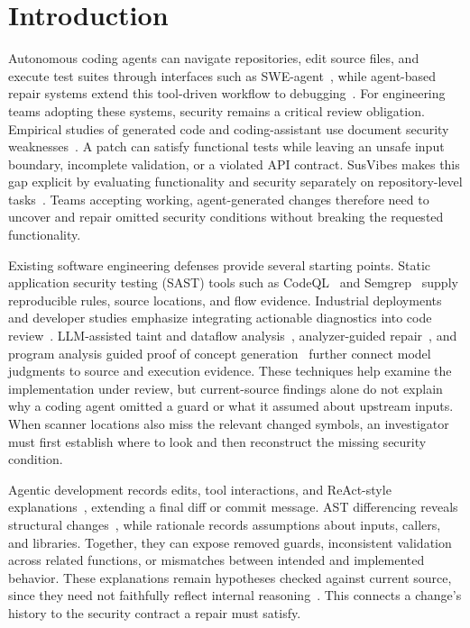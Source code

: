 \documentclass[10pt,conference]{IEEEtran}
\begin{document}
\section{Introduction}
Autonomous coding agents can navigate repositories, edit source files, and execute test suites through interfaces such as SWE-agent~\cite{sweagent}, while agent-based repair systems extend this tool-driven workflow to debugging~\cite{repairagent}. For engineering teams adopting these systems, security remains a critical review obligation. Empirical studies of generated code and coding-assistant use document security weaknesses~\cite{asleep,perry,copilotweaknesses}. A patch can satisfy functional tests while leaving an unsafe input boundary, incomplete validation, or a violated API contract. SusVibes makes this gap explicit by evaluating functionality and security separately on repository-level tasks~\cite{susvibes,susvibesartifact}. Teams accepting working, agent-generated changes therefore need to uncover and repair omitted security conditions without breaking the requested functionality.

Existing software engineering defenses provide several starting points. Static application security testing (SAST) tools such as CodeQL~\cite{codeql} and Semgrep~\cite{semgrep} supply reproducible rules, source locations, and flow evidence. Industrial deployments and developer studies emphasize integrating actionable diagnostics into code review~\cite{johnson,googleanalysis,infer}. LLM-assisted taint and dataflow analysis~\cite{iris,llmdfa,repoaudit}, analyzer-guided repair~\cite{inferfix}, and program analysis guided proof of concept generation~\cite{pagent} further connect model judgments to source and execution evidence. These techniques help examine the implementation under review, but current-source findings alone do not explain why a coding agent omitted a guard or what it assumed about upstream inputs. When scanner locations also miss the relevant changed symbols, an investigator must first establish where to look and then reconstruct the missing security condition.

Agentic development records edits, tool interactions, and ReAct-style explanations~\cite{react}, extending a final diff or commit message. AST differencing reveals structural changes~\cite{gumtree}, while rationale records assumptions about inputs, callers, and libraries. Together, they can expose removed guards, inconsistent validation across related functions, or mismatches between intended and implemented behavior. These explanations remain hypotheses checked against current source, since they need not faithfully reflect internal reasoning~\cite{turpin,lanham}. This connects a change's history to the security contract a repair must satisfy.
\end{document}
